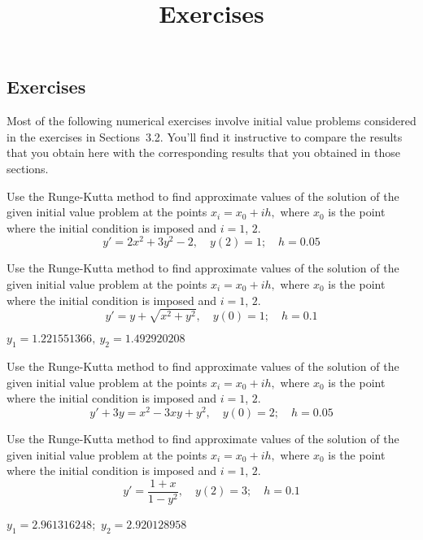 \documentclass{ximera}
\title{Exercises} \license{CC BY-NC-SA 4.0}
\begin{document}
\begin{abstract}
\end{abstract}
\maketitle

\begin{onlineOnly}
\section*{Exercises}
\end{onlineOnly}


Most of the following numerical exercises involve initial value
problems considered in the exercises in Sections~3.2.
 You'll find it instructive to compare the results that you
obtain here with the corresponding results that you obtained in those
sections.

\begin{problem}\label{exer:3.3.1} Use the Runge-Kutta method to
find approximate values of the solution of the given initial value
problem at the points $x_i=x_0+ih,$ where $x_0$ is the point where
the initial condition is imposed and $i=1$, $2$.
$$y'=2x^2+3y^2-2,\quad y(2)=1;\quad h=0.05$$
\end{problem}

\begin{problem}\label{exer:3.3.2} Use the Runge-Kutta method to
find approximate values of the solution of the given initial value
problem at the points $x_i=x_0+ih,$ where $x_0$ is the point where
the initial condition is imposed and $i=1$, $2$.
$$y'=y+\sqrt{x^2+y^2},\quad y(0)=1;\quad h=0.1$$

\begin{solution}
    $y_1=1.221551366,\ y_2=1.492920208$
\end{solution}
\end{problem}

\begin{problem}\label{exer:3.3.3} Use the Runge-Kutta method to
find approximate values of the solution of the given initial value
problem at the points $x_i=x_0+ih,$ where $x_0$ is the point where
the initial condition is imposed and $i=1$, $2$.
$$y'+3y=x^2-3xy+y^2,\quad y(0)=2;\quad h=0.05$$
\end{problem}

\begin{problem}\label{exer:3.3.4} Use the Runge-Kutta method to
find approximate values of the solution of the given initial value
problem at the points $x_i=x_0+ih,$ where $x_0$ is the point where
the initial condition is imposed and $i=1$, $2$.
$$y'=\frac{1+x}{1-y^2},\quad y(2)=3;\quad h=0.1$$

\begin{solution}
    $ y_1=2.961316248$;\ $ y_2=2.920128958$
\end{solution}
\end{problem}
\end{document}
